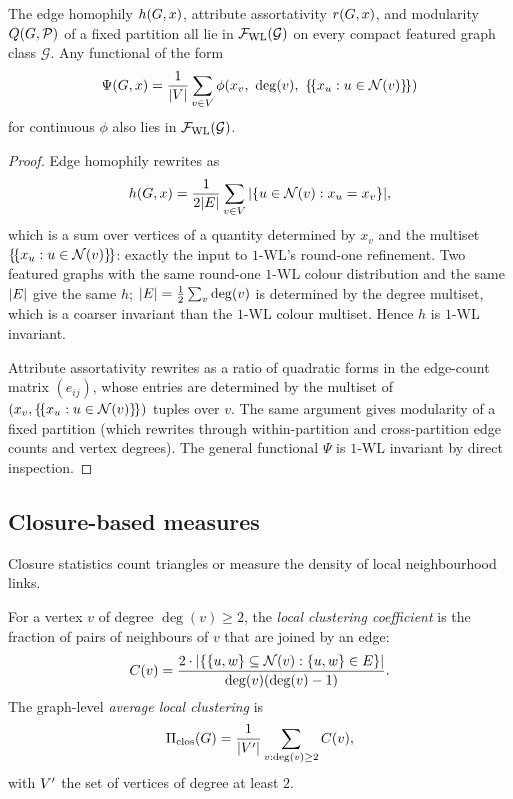 \begin{proposition}\label{prop:computable-measures}
The edge homophily $h(G, x)$, attribute assortativity $r(G,
x)$, and modularity $Q(G, \mathcal{P})$ of a fixed partition all
lie in $\mathcal{F}_{\mathrm{WL}}(\mathcal{G})$ on every compact featured
graph class $\mathcal{G}$. Any functional of the form
\[
\Psi(\gph, x) = \frac{1}{|\vertices|} \sum_{v \in \vertices} \phi\!\left(x_v,\ \deg(v),\ \{\!\{x_u : u \in \neigh{v}\}\!\}\right)
\]
for continuous $\phi$ also lies in $\mathcal{F}_{\mathrm{WL}}(\mathcal{G})$.
\end{proposition}

\begin{proof}
Edge homophily rewrites as
\[
h(G, x) = \frac{1}{2|E|} \sum_{v \in V} |\{u \in
\mathcal{N}(v) : x_u = x_v\}|,
\]
which is a sum over vertices of a quantity determined by $x_v$ and
the multiset $\{\!\{x_u : u \in \mathcal{N}(v)\}\!\}$: exactly the input
to $1$-WL's round-one refinement. Two featured graphs with the same
round-one $1$-WL colour distribution and the same $|E|$ give
the same $h$; $|E| = \frac{1}{2} \sum_v \deg(v)$ is determined
by the degree multiset, which is a coarser invariant than the
$1$-WL colour multiset. Hence $h$ is $1$-WL invariant.

Attribute assortativity rewrites as a ratio of quadratic forms in
the edge-count matrix $(e_{ij})$, whose entries are determined by
the multiset of $(x_v, \{\!\{x_u : u \in \mathcal{N}(v)\}\!\})$ tuples
over $v$. The same argument gives modularity of a fixed partition
(which rewrites through within-partition and cross-partition edge
counts and vertex degrees). The general functional $\Psi$ is
$1$-WL invariant by direct inspection.
\end{proof}

\subsection{Closure-based measures}

Closure statistics count triangles or measure the density of local
neighbourhood links.

\begin{definition}\label{def:clustering}
For a vertex $v$ of degree $\deg(v) \ge 2$, the \emph{local
clustering coefficient} is the fraction of pairs of neighbours of
$v$ that are joined by an edge:
\[
C(v) = \frac{2 \cdot |\{\{u, w\} \subseteq \mathcal{N}(v) : \{u, w\} \in
E\}|}{\deg(v) (\deg(v) - 1)}.
\]
The graph-level \emph{average local clustering} is
\[
\Pi_{\mathrm{clos}}(G) = \frac{1}{|V'|} \sum_{v : \deg(v) \ge 2} C(v),
\]
with $V'$ the set of vertices of degree at least $2$.
\end{definition}

